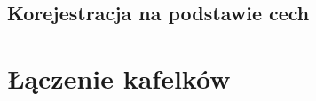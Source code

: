 \subsection{Korejestracja na podstawie cech}
\label{sec:algorytmy_korejestracji:korejestracja_na_podstawie_cech}

\section{Łączenie kafelków}
\label{sec:algorytmy_korejestracji:laczenie_kafelkow}






















